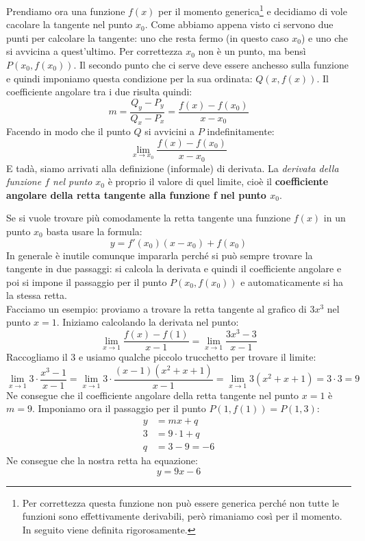 Prendiamo ora una funzione $f(x)$ per il momento generica\footnote{Per correttezza questa funzione non può essere generica perché non tutte le funzioni sono effettivamente derivabili, però rimaniamo così per il momento. In seguito viene definita rigorosamente.} e decidiamo di vole cacolare la tangente nel punto $x_0$. Come abbiamo appena visto ci servono due punti per calcolare la tangente: uno che resta fermo (in questo caso $x_0$) e uno che si avvicina a quest'ultimo. Per correttezza $x_0$ non è un punto, ma bensì $P(x_0, f(x_0))$. Il secondo punto che ci serve deve essere anchesso sulla funzione e quindi imponiamo questa condizione per la sua ordinata: $Q(x, f(x))$. Il coefficiente angolare tra i due risulta quindi:
\begin{equation*}
	m = \dfrac{Q_y - P_y}{Q_x - P_x} = \dfrac{f(x) - f(x_0)}{x-x_0}
\end{equation*}
Facendo in modo che il punto $Q$ si avvicini a $P$ indefinitamente:
\begin{equation*}
	\lim_{x \to x_0} \dfrac{f(x) - f(x_0)}{x-x_0}
\end{equation*}
E tadà, siamo arrivati alla definizione (informale) di derivata. La \textit{derivata della funzione $f$ nel punto $x_0$} è proprio il valore di quel limite, cioè il \textbf{coefficiente angolare della retta tangente alla funzione f nel punto $x_0$}. 

Se si vuole trovare più comodamente la retta tangente una funzione $f(x)$ in un punto $x_0$ basta usare la formula:
\begin{equation*}
	y = f'(x_0) (x - x_0) + f(x_0)
\end{equation*}
In generale è inutile comunque impararla perché si può sempre trovare la tangente in due passaggi: si calcola la derivata e quindi il coefficiente angolare e poi si impone il passaggio per il punto $P(x_0, f(x_0))$ e automaticamente si ha la stessa retta.\\

Facciamo un esempio: proviamo a trovare la retta tangente al grafico di $3x^3$ nel punto $x = 1$. Iniziamo calcolando la derivata nel punto:
\begin{equation*}
	\lim_{x \to 1} \dfrac{f(x) - f(1)}{x - 1} = \lim_{x \to 1} \dfrac{3x^3 - 3}{x - 1}
\end{equation*}
Raccogliamo il $3$ e usiamo qualche piccolo trucchetto per trovare il limite:
\begin{equation*}
	\lim_{x \to 1} 3 \cdot \dfrac{x^3 - 1}{x - 1} = \lim_{x \to 1} 3 \cdot \dfrac{(x - 1)(x^2 + x + 1)}{x - 1} = \lim_{x \to 1} 3(x^2 + x + 1) = 3 \cdot 3 = 9
\end{equation*}
Ne consegue che il coefficiente angolare della retta tangente nel punto $x = 1$ è $m = 9$. Imponiamo ora il passaggio per il punto $P(1, f(1)) = P(1, 3)$:
\begin{align*}
	y &= mx + q\\
	3 &= 9 \cdot 1 + q\\
	q &= 3 - 9 = -6
\end{align*}
Ne consegue che la nostra retta ha equazione:
\begin{equation*}
	y = 9x - 6
\end{equation*}

